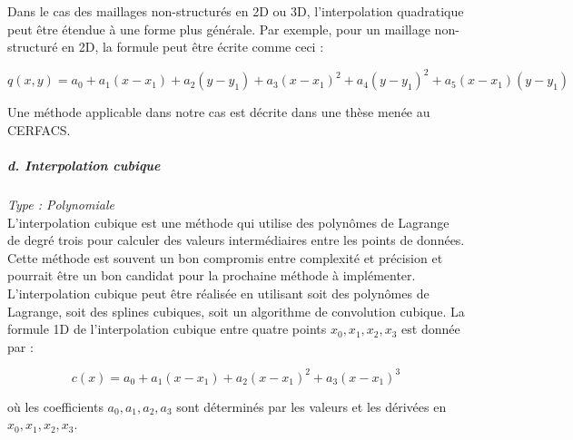 Dans le cas des maillages non-structurés en 2D ou 3D, l'interpolation quadratique peut être étendue à une forme plus générale. Par exemple, pour un maillage non-structuré en 2D, la formule peut être écrite comme ceci :

\vspace{-0,5 cm}

\begin{equation}
    q(x, y) = a_0 + a_1(x - x_1) + a_2(y - y_1) + a_3(x - x_1)^2 + a_4(y - y_1)^2 + a_5(x - x_1)(y - y_1)
\end{equation}

Une méthode applicable dans notre cas est décrite dans une thèse menée au CERFACS\cite{alexis}.


\subparagraph{d. Interpolation cubique \cite{tanaka}}
\textit{Type : Polynomiale} \\
\phantom{----}L'interpolation cubique est une méthode qui utilise des polynômes de Lagrange de degré trois pour calculer des valeurs intermédiaires entre les points de données. Cette méthode est souvent un bon compromis entre complexité et précision et pourrait être un bon candidat pour la prochaine méthode à implémenter. L'interpolation cubique peut être réalisée en utilisant soit des polynômes de Lagrange, soit des splines cubiques, soit un algorithme de convolution cubique.
La formule 1D de l'interpolation cubique entre quatre points \( x_0, x_1, x_2, x_3 \) est donnée par :

\vspace{-0,5 cm}

\begin{equation}
    c(x) = a_0 + a_1(x - x_1) + a_2(x - x_1)^2 + a_3(x - x_1)^3
\end{equation}

où les coefficients \( a_0, a_1, a_2, a_3 \) sont déterminés par les valeurs et les dérivées en \( x_0, x_1, x_2, x_3 \).


